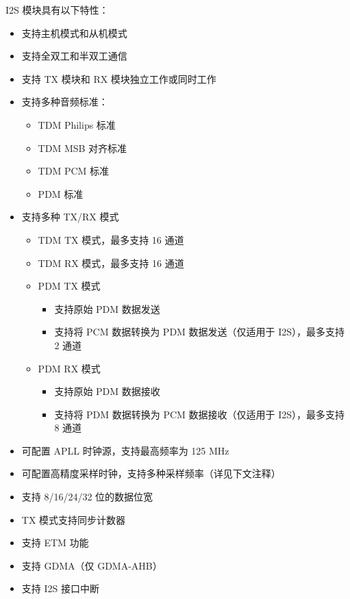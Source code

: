 \documentclass[main\_\_CN.tex]{subfiles}
\begin{document}
I2S 模块具有以下特性：

\begin{itemize}
    \item 支持主机模式和从机模式
    \item 支持全双工和半双工通信
    \item 支持 TX 模块和 RX 模块独立工作或同时工作
    \item 支持多种音频标准：
        \begin{itemize}    
            \item TDM Philips 标准
            \item TDM MSB 对齐标准
            \item TDM PCM 标准
            \item PDM 标准
        \end{itemize}
    \item 支持多种 TX/RX 模式
        \begin{itemize}
        \item TDM TX 模式，最多支持 16 通道
        \item TDM RX 模式，最多支持 16 通道
        \item PDM TX 模式
        \begin{itemize}
            \item 支持原始 PDM 数据发送
            \item 支持将 PCM 数据转换为 PDM 数据发送（仅适用于 I2S），最多支持 2 通道
        \end{itemize}
        \item PDM RX 模式
        \begin{itemize}
            \item 支持原始 PDM 数据接收
            \item 支持将 PDM 数据转换为 PCM 数据接收（仅适用于 I2S），最多支持 8 通道
        \end{itemize}
        \end{itemize}
    \item 可配置 APLL 时钟源，支持最高频率为 125 MHz
    \item 可配置高精度采样时钟，支持多种采样频率（详见下文注释）
    \item 支持 8/16/24/32 位的数据位宽
    \item TX 模式支持同步计数器
    \item 支持 ETM 功能
    \item 支持 GDMA（仅 GDMA-AHB）
    \item 支持 I2S 接口中断
\end{itemize}
\end{document}
